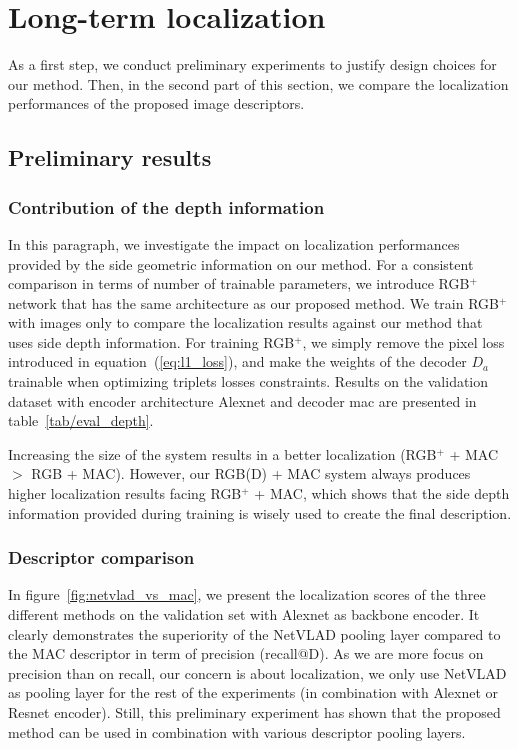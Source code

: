 \section{Long-term localization}
\label{sec:experiments}

As a first step, we conduct preliminary experiments to justify design choices for our method. Then, in the second part of this section, we compare the localization performances of the proposed image descriptors.

\subsection{Preliminary results}

\subsubsection{Contribution of the depth information}

In this paragraph, we investigate the impact on localization performances provided by the side geometric information on our method. For a consistent comparison in terms of number of trainable parameters, we introduce RGB$^+$ network that has the same architecture as our proposed method. We train RGB$^+$ with images only to compare the localization results against our method that uses side depth information. For training RGB$^+$, we simply remove the pixel loss introduced in equation~(\ref{eq:l1_loss}), and make the weights of the decoder $D_a$ trainable when optimizing triplets losses constraints. Results on the validation dataset with encoder architecture Alexnet and decoder \ac{mac} are presented in table~\ref{tab/eval_depth}.

Increasing the size of the system results in a better localization (RGB$^{+}$ + MAC $>$ RGB + MAC). However, our RGB(D) + MAC system always produces higher localization results facing RGB$^{+}$ + MAC, which shows that the side depth information provided during training is wisely used to create the final description.

\subsubsection{Descriptor comparison}

In figure~\ref{fig:netvlad_vs_mac}, we present the localization scores of the three different methods on the validation set with Alexnet as backbone encoder. It clearly demonstrates the superiority of the NetVLAD pooling layer compared to the MAC descriptor in term of precision (recall@D). As we are more focus on precision than on recall, our concern is about localization, we only use NetVLAD as pooling layer for the rest of the experiments (in combination with Alexnet or Resnet encoder). Still, this preliminary experiment has shown that the proposed method can be used in combination with various descriptor pooling layers.

